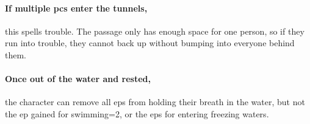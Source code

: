 {  \paragraph{If multiple \glspl{pc} enter the tunnels,}
  this spells trouble.
  The passage only has enough space for one person, so if they run into trouble, they cannot back up without bumping into everyone behind them.

  \paragraph{Once out of the water and rested,}
  the character can remove all \glspl{ep} from holding their breath in the water, but not the \gls{ep} gained for swimming\ifnum\value{temperature}=2\else, or the \glspl{ep} for entering freezing waters\fi.


}
